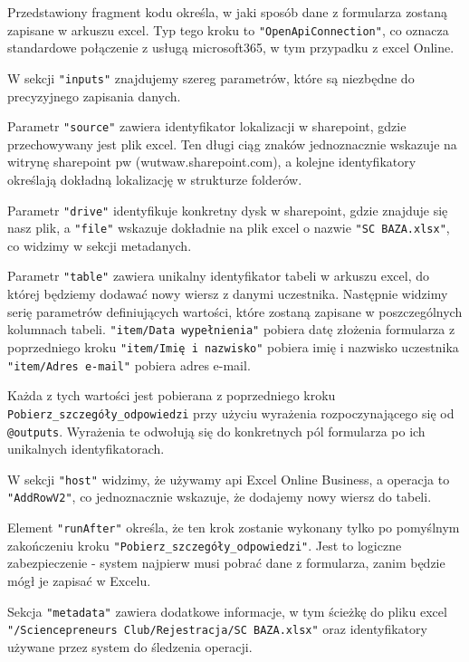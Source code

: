 Przedstawiony fragment kodu określa, w jaki sposób dane z formularza zostaną zapisane w arkuszu \gls{excel}. Typ tego kroku to \texttt{"OpenApiConnection"}, co oznacza standardowe połączenie z usługą \gls{microsoft365}, w tym przypadku z \gls{excel} Online.

W sekcji \texttt{"inputs"} znajdujemy szereg parametrów, które są niezbędne do precyzyjnego zapisania danych. 

Parametr \texttt{"source"} zawiera identyfikator lokalizacji w \gls{sharepoint}, gdzie przechowywany jest plik \gls{excel}. Ten długi ciąg znaków jednoznacznie wskazuje na witrynę \gls{sharepoint} \gls{pw} (wutwaw.sharepoint.com), a kolejne identyfikatory określają dokładną lokalizację w strukturze folderów. 

Parametr \texttt{"drive"} identyfikuje konkretny dysk w \gls{sharepoint}, gdzie znajduje się nasz plik, a \texttt{"file"} wskazuje dokładnie na plik \gls{excel} o nazwie \texttt{"SC BAZA.xlsx"}, co widzimy w sekcji metadanych.

Parametr \texttt{"table"} zawiera unikalny identyfikator tabeli w arkuszu \gls{excel}, do której będziemy dodawać nowy wiersz z danymi uczestnika.
Następnie widzimy serię parametrów definiujących wartości, które zostaną zapisane w poszczególnych kolumnach tabeli. \texttt{"item/Data wypełnienia"} pobiera datę złożenia formularza z poprzedniego kroku \texttt{"item/Imię i nazwisko"} pobiera imię i nazwisko uczestnika \texttt{"item/Adres e-mail"} pobiera adres e-mail. 

Każda z tych wartości jest pobierana z  poprzedniego kroku \texttt{Pobierz\_szczegóły\_odpowiedzi} przy użyciu wyrażenia rozpoczynającego się od \texttt{@outputs}. Wyrażenia te odwołują się do konkretnych pól formularza po ich unikalnych identyfikatorach.

W sekcji \texttt{"host"} widzimy, że używamy \gls{api} Excel Online Business, a operacja to \texttt{"AddRowV2"}, co jednoznacznie wskazuje, że dodajemy nowy wiersz do tabeli.

Element \texttt{"runAfter"} określa, że ten krok zostanie wykonany tylko po pomyślnym zakończeniu kroku \texttt{"Pobierz\_szczegóły\_odpowiedzi"}. Jest to logiczne zabezpieczenie - system najpierw musi pobrać dane z formularza, zanim będzie mógł je zapisać w Excelu.

Sekcja \texttt{"metadata"} zawiera dodatkowe informacje, w tym ścieżkę do pliku \gls{excel} \texttt{"/Sciencepreneurs Club/Rejestracja/SC BAZA.xlsx"} oraz identyfikatory używane przez system do śledzenia operacji.

